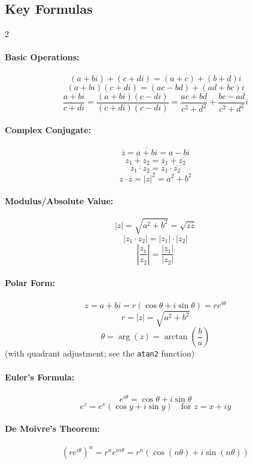 \subsection*{Key Formulas}
\begin{multicols}{2}

\paragraph{Basic Operations:}
\[
(a + bi) + (c + di) = (a + c) + (b + d)i
\]
\[
(a + bi)(c + di) = (ac - bd) + (ad + bc)i
\]
\[
\frac{a + bi}{c + di} = \frac{(a + bi)(c - di)}{(c + di)(c - di)} = \frac{ac + bd}{c^2 + d^2} + \frac{bc - ad}{c^2 + d^2}i
\]

\paragraph{Complex Conjugate:}
\[
\overline{z} = \overline{a + bi} = a - bi
\]
\[
\overline{z_1 + z_2} = \overline{z_1} + \overline{z_2}
\]
\[
\overline{z_1 \cdot z_2} = \overline{z_1} \cdot \overline{z_2}
\]
\[
z \cdot \overline{z} = |z|^2 = a^2 + b^2
\]

\paragraph{Modulus/Absolute Value:}
\[
|z| = \sqrt{a^2 + b^2} = \sqrt{z\overline{z}}
\]
\[
|z_1 \cdot z_2| = |z_1| \cdot |z_2|
\]
\[
\left|\frac{z_1}{z_2}\right| = \frac{|z_1|}{|z_2|}
\]

\paragraph{Polar Form:}
\[
z = a + bi = r(\cos\theta + i\sin\theta) = re^{i\theta}
\]
\[
r = |z| = \sqrt{a^2 + b^2}
\]
\[
\theta = \arg(z) = \arctan\left(\frac{b}{a}\right)
\]
(with quadrant adjustment; see the \texttt{atan2} function)

\paragraph{Euler's Formula:}
\[
e^{i\theta} = \cos\theta + i\sin\theta
\]
\[
e^{z} = e^{x}(\cos y + i\sin y) \quad \text{for } z = x + iy
\]

\paragraph{De Moivre's Theorem:}
\[
(re^{i\theta})^n = r^n e^{in\theta} = r^n(\cos(n\theta) + i\sin(n\theta))
\]


\end{multicols}
